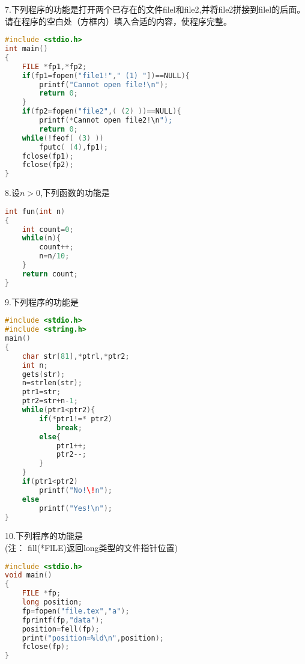 7.下列程序的功能是打开两个已存在的文件filel和file2,并将file2拼接到filel的后面。 \\
请在程序的空白处（方框内）填入合适的内容，使程序完整。
\begin{lstlisting}[language=cpp]
#include <stdio.h>
int main()
{
    FILE *fp1,*fp2;
    if(fp1=fopen("file1!"," (1) "])==NULL){
        printf("Cannot open file!\n");
        return 0;
    }
    if(fp2=fopen("file2",( (2) ))==NULL){
        printf(*Cannot open file2!\n");
        return 0;
    while(!feof( (3) ))
        fputc( (4),fp1);
    fclose(fp1);
    fclose(fp2);
}
\end{lstlisting}

8.设$n>0$,下列函数的功能是  \\
\begin{lstlisting}[language=cpp]
int fun(int n)
{
    int count=0;
    while(n){
        count++;
        n=n/10;
    }
    return count;
}
\end{lstlisting}

9.下列程序的功能是 \\
\begin{lstlisting}[language=cpp]
#include <stdio.h>
#include <string.h>
main()
{
    char str[81],*ptrl,*ptr2;
    int n;
    gets(str);
    n=strlen(str);
    ptr1=str;
    ptr2=str+n-1;
    while(ptr1<ptr2){
        if(*ptr1!=* ptr2)
            break;
        else{
            ptr1++;
            ptr2--;
        }
    }
    if(ptr1<ptr2)
        printf("No!\!n");
    else
        printf("Yes!\n");
}
\end{lstlisting}

10.下列程序的功能是 \\
(注： fill(*FlLE)返回long类型的文件指针位置)
\begin{lstlisting}[language=cpp]
#include <stdio.h>
void main()
{
    FILE *fp;
    long position;
    fp=fopen("file.tex","a");
    fprintf(fp,"data");
    position=fell(fp);
    print("position=%ld\n",position);
    fclose(fp);
}
\end{lstlisting}